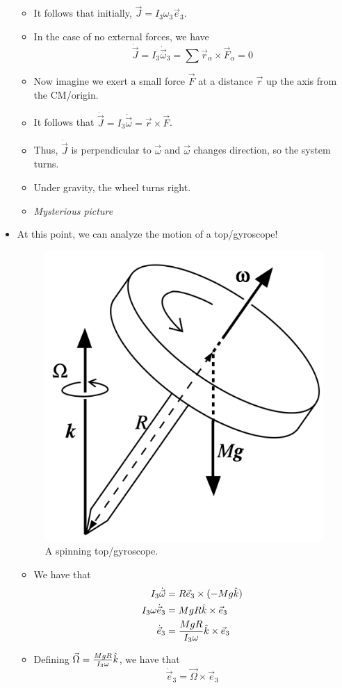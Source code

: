 \documentclass[../notes.tex]{subfiles}
\begin{document}
\begin{itemize}
\begin{itemize}
        \item It follows that initially, $\vec{J}=I_3\omega_3\vec{e}_3$.
        \item In the case of no external forces, we have
        \begin{equation*}
            \dot{\vec{J}} = I_3\dot{\vec{\omega}}_3
            = \sum\vec{r}_\alpha\times\vec{F}_\alpha
            = 0
        \end{equation*}
        \item Now imagine we exert a small force $\vec{F}$ at a distance $\vec{r}$ up the axis from the CM/origin.
        \item It follows that $\dot{\vec{J}}=I_3\dot{\vec{\omega}}=\vec{r}\times\vec{F}$.
        \item Thus, $\dot{\vec{J}}$ is perpendicular to $\vec{\omega}$ and $\vec{\omega}$ changes direction, so the system turns.
        \item Under gravity, the wheel turns right.
        \item \emph{Mysterious picture}
    \end{itemize}
    \item At this point, we can analyze the motion of a top/gyroscope!
    \begin{figure}[h!]
        \centering
        \includegraphics[width=0.2\linewidth]{../ExtFiles/topGyroscope.png}
        \caption{A spinning top/gyroscope.}
        \label{fig:topGyroscope}
    \end{figure}
    \begin{itemize}
        \item We have that
        \begin{align*}
            I_3\dot{\vec{\omega}} &= R\vec{e}_3\times(-Mg\hat{k})\\
            I_3\omega\dot{\vec{e}}_3 &= MgR\hat{k}\times\vec{e}_3\\
            \dot{\vec{e}}_3 &= \frac{MgR}{I_3\omega}\hat{k}\times\vec{e}_3
        \end{align*}
        \item Defining $\vec{\Omega}=\frac{MgR}{I_3\omega}\hat{k}$, we have that
        \begin{equation*}
            \dot{\vec{e}}_3 = \vec{\Omega}\times\vec{e}_3

\end{equation*}
\end{itemize}
\end{itemize}
\end{document}
